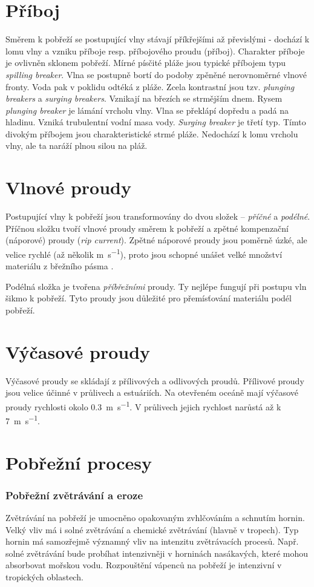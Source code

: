 \section{Příboj}
Směrem k pobřeží se postupující vlny stávají příkřejšími až převislými - dochází k lomu vlny a vzniku příboje resp. příbojového proudu (příboj). Charakter příboje je ovlivněn sklonem pobřeží. Mírné písčité pláže jsou typické příbojem typu \textit{spilling breaker}. Vlna se postupně bortí do podoby zpěněné nerovnoměrné vlnové fronty. Voda pak v poklidu odtéká z pláže. Zcela kontrastní jsou tzv. \textit{plunging breakers} a \textit{surging breakers}. Vznikají na březích se strmějším dnem. Rysem \textit{plunging breaker} je lámání vrcholu vlny. Vlna se překlápí dopředu a padá na hladinu. Vzniká trubulentní vodní masa vody. \textit{Surging breaker} je třetí typ. Tímto divokým příbojem jsou charakteristické strmé pláže. Nedochází k lomu vrcholu vlny, ale ta naráží plnou silou na pláž.

\section{Vlnové proudy}
Postupující vlny k pobřeží jsou transformovány do dvou složek -- \emph{příčné} a \emph{podélné}. Příčnou složku tvoří vlnové proudy směrem k pobřeží a zpětné kompenzační (náporové) proudy (\textit{rip current}). Zpětné náporové proudy jsou poměrně úzké, ale velice rychlé (až několik \si{\metre\per\second}), proto jsou schopné unášet velké množství materiálu z břežního pásma \parencite{demekObecnaGeomorfologie1987}. 

Podélná složka je tvořena \emph{příbřežními} proudy. Ty nejlépe fungují při postupu vln šikmo k pobřeží. Tyto proudy jsou důležité pro přemísťování materiálu podél pobřeží.

\section{Výčasové proudy}
Výčasové proudy se skládají z přílivových a odlivových proudů. Přílivové proudy jsou velice účinné v průlivech a estuáriích. Na otevřeném oceáně mají výčasové proudy rychlosti okolo \SI{0,3}{\metre\per\second}. V průlivech jejich rychlost narůstá až k \SI{7}{\metre\per\second}.

\section{Pobřežní procesy}
\subsubsection{Pobřežní zvětrávání a eroze}
Zvětrávání na pobřeží je umocněno opakovaným zvhlčováním a schnutím hornin. Velký vliv má i solné zvětrávání a chemické zvětrávání (hlavně v tropech). Typ hornin má samozřejmě významný vliv na intenzitu zvětrávacích procesů. Např. solné zvětrávání bude probíhat intenzivněji v horninách nasákavých, které mohou absorbovat mořskou vodu. Rozpouštění vápenců na pobřeží je intenzivní v tropických oblastech.


